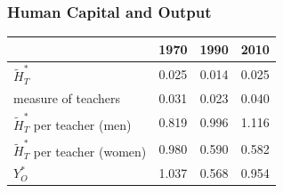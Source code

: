 \documentclass[11pt]{beamer}
\begin{document}

\begin{frame}
\frametitle{Human Capital and Output}

\begin{table}
  \centering \begin{tabular}{lccc}
\toprule
& 1970 & 1990 & 2010 \\
\midrule
$\widetilde{H}_T^*$ & 0.025  & 0.014 & 0.025 \\
measure of teachers & 0.031 & 0.023 & 0.040\\
$\widetilde{H}_T^*$ per teacher (men)   & 0.819 & 0.996 & 1.116 \\
$\widetilde{H}_T^*$ per teacher (women)   & 0.980 & 0.590 & 0.582 \\
$Y_O^*$ & 1.037 & 0.568 & 0.954 \\
\bottomrule
\end{tabular}
  \label{ }
\end{table}


\end{frame}

%
\end{document}
